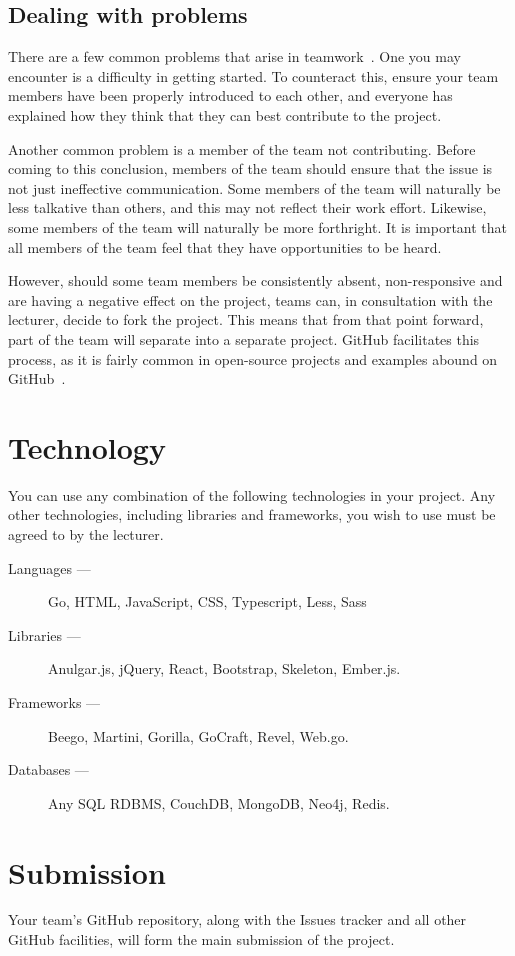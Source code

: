 \subsection*{Dealing with problems}
There are a few common problems that arise in teamwork~\cite{teamworkproblems}.
One you may encounter is a difficulty in getting started.
To counteract this, ensure your team members have been properly introduced to each other, and everyone has explained how they think that they can best contribute to the project.

Another common problem is a member of the team not contributing.
Before coming to this conclusion, members of the team should ensure that the issue is not just ineffective communication.
Some members of the team will naturally be less talkative than others, and this may not reflect their work effort.
Likewise, some members of the team will naturally be more forthright.
It is important that all members of the team feel that they have opportunities to be heard.

However, should some team members be consistently absent, non-responsive and are having a negative effect on the project, teams can, in consultation with the lecturer, decide to fork the project.
This means that from that point forward, part of the team will separate into a separate project.
GitHub facilitates this process, as it is fairly common in open-source projects and examples abound on GitHub~\cite{githubforking}.

\section*{Technology}
You can use any combination of the following technologies in your project.
Any other technologies, including libraries and frameworks, you wish to use must be agreed to by the lecturer.

\begin{description}
\item[Languages ---] Go, HTML, JavaScript, CSS, Typescript, Less, Sass
\item[Libraries ---] Anulgar.js, jQuery, React, Bootstrap, Skeleton, Ember.js.
\item[Frameworks ---] Beego, Martini, Gorilla, GoCraft, Revel, Web.go.
\item[Databases ---] Any SQL RDBMS, CouchDB, MongoDB, Neo4j, Redis.
\end{description}

\section*{Submission}
Your team's GitHub repository, along with the Issues tracker and all other GitHub facilities, will form the main submission of the project.

